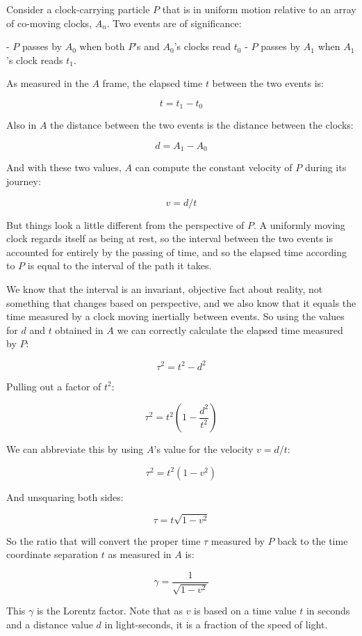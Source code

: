 Consider a clock-carrying particle $P$ that is in uniform motion relative to an array of co-moving clocks, $A_n$. Two events are of significance:

-   $P$ passes by $A_0$ when both $P$'s and $A_0$'s clocks read $t_0$
-   $P$ passes by $A_1$ when $A_1$'s clock reads $t_1$.

As measured in the $A$ frame, the elapsed time $t$ between the two events is:

$$t = t_1 - t_0$$

Also in $A$ the distance between the two events is the distance between the clocks:

$$d = A_1 - A_0$$

And with these two values, $A$ can compute the constant velocity of $P$ during its journey:

$$v = d/t$$

But things look a little different from the perspective of $P$. A uniformly moving clock regards itself as being at rest, so the interval between the two events is accounted for entirely by the passing of time, and so the elapsed time according to $P$ is equal to the interval of the path it takes.

We know that the interval is an invariant, objective fact about reality, not something that changes based on perspective, and we also know that it equals the time measured by a clock moving inertially between events. So using the values for $d$ and $t$ obtained in $A$ we can correctly calculate the elapsed time measured by $P$:

$$\tau^2 = t^2 - d^2$$

Pulling out a factor of $t^2$:

$$\tau^2 = t^2(1 - \frac{d^2}{t^2})$$

We can abbreviate this by using $A$'s value for the velocity $v = d/t$:

$$\tau^2 = t^2(1 - v^2)$$

And unsquaring both sides:

$$\tau = t\sqrt{1 - v^2}$$

So the ratio that will convert the proper time $\tau$ measured by $P$ back to the time coordinate separation $t$ as measured in $A$ is:

$$\gamma = \frac{1}{\sqrt{1 - v^2}}$$

This $\gamma$ is the Lorentz factor. Note that as $v$ is based on a time value $t$ in seconds and a distance value $d$ in light-seconds, it is a fraction of the speed of light.

